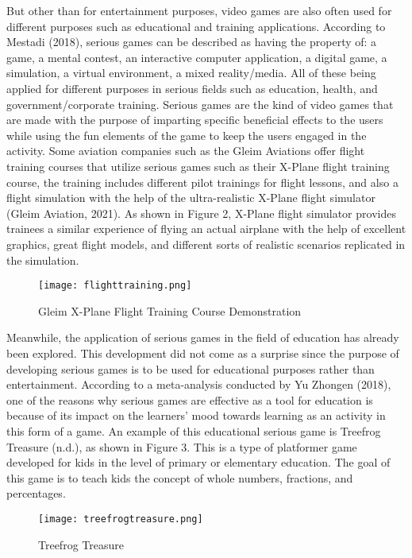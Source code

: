 But other than for entertainment purposes, video games are also often used for different purposes such as educational and training applications. According to Mestadi (2018), serious games can be described as having the property of: a game, a mental contest, an interactive computer application, a digital game, a simulation, a virtual environment, a mixed reality/media. All of these being applied for different purposes in serious fields such as education, health, and government/corporate training. Serious games are the kind of video games that are made with the purpose of imparting specific beneficial effects to the users while using the fun elements of the game to keep the users engaged in the activity. Some aviation companies such as the Gleim Aviations offer flight training courses that utilize serious games such as their X-Plane flight training course, the training includes different pilot trainings for flight lessons, and also a flight simulation with the help of the ultra-realistic X-Plane flight simulator (Gleim Aviation, 2021). As shown in Figure 2, X-Plane flight simulator provides trainees a similar experience of flying an actual airplane with the help of excellent graphics, great flight models, and different sorts of realistic scenarios replicated in the simulation.

\begin{figure}[h]
   \centering                    
   \texttt{[image: flighttraining.png]}
   \caption{Gleim X-Plane Flight Training Course Demonstration}
    \label{fig:flighttraining}
\end{figure}

Meanwhile, the application of serious games in the field of education has already been explored. This development did not come as a surprise since the purpose of developing serious games is to be used for educational purposes rather than entertainment. According to a meta-analysis conducted by Yu Zhongen (2018), one of the reasons why serious games are effective as a tool for education is because of its impact on the learners’ mood towards learning as an activity in this form of a game. An example of this educational serious game is Treefrog Treasure (n.d.), as shown in Figure 3. This is a type of platformer game developed for kids in the level of primary or elementary education. The goal of this game is to teach kids the concept of whole numbers, fractions, and percentages.

\begin{figure}[h]
   \centering                    
   \texttt{[image: treefrogtreasure.png]}
   \caption{Treefrog Treasure}
    \label{fig:treefrogtreasure}
\end{figure}

